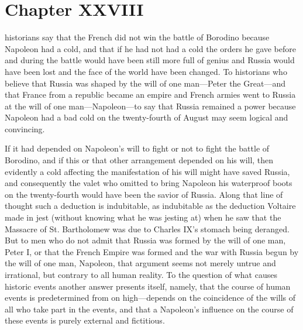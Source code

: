 
\chapter*{Chapter XXVIII} \ifaudio {}
\fi

 historians say that the French did not win the battle of
Borodino because Napoleon had a cold, and that if he had not had
a cold the orders he gave before and during the battle would have
been still more full of genius and Russia would have been lost
and the face of the world have been changed. To historians who
believe that Russia was shaped by the will of one man---Peter the
Great---and that France from a republic became an empire and
French armies went to Russia at the will of one
man---Napoleon---to say that Russia remained a power because
Napoleon had a bad cold on the twenty-fourth of August may seem
logical and convincing.

If it had depended on Napoleon's will to fight or not to fight
the battle of Borodino, and if this or that other arrangement
depended on his will, then evidently a cold affecting the
manifestation of his will might have saved Russia, and
consequently the valet who omitted to bring Napoleon his
waterproof boots on the twenty-fourth would have been the savior
of Russia. Along that line of thought such a deduction is
indubitable, as indubitable as the deduction Voltaire made in
jest (without knowing what he was jesting at) when he saw that
the Massacre of St. Bartholomew was due to Charles IX's stomach
being deranged. But to men who do not admit that Russia was
formed by the will of one man, Peter I, or that the French Empire
was formed and the war with Russia begun by the will of one man,
Napoleon, that argument seems not merely untrue and irrational,
but contrary to all human reality. To the question of what causes
historic events another answer presents itself, namely, that the
course of human events is predetermined from on high---depends on
the coincidence of the wills of all who take part in the events,
and that a Napoleon's influence on the course of these events is
purely external and fictitious.

